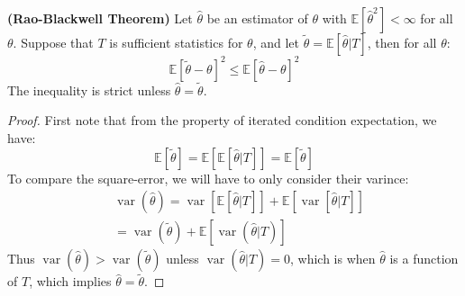 \begin{theorem}{\textbf{(Rao-Blackwell Theorem)}}
    Let $\hat{\theta}$ be an estimator of $\theta$ with $\mathbb{E}[\hat{\theta}^2]<\infty$ for all $\theta$. Suppose that $T$ is sufficient statistics for $\theta$, and let $\tilde{\theta} = \mathbb{E}[\hat{\theta} | T]$, then for all $\theta$:
    \begin{equation*}
        \mathbb{E}[\tilde{\theta} - \theta]^2 \le \mathbb{E}[\hat{\theta} - \theta]^2
    \end{equation*}
    The inequality is strict unless $\hat{\theta} = \tilde{\theta}$.
\end{theorem}
\begin{proof}
    First note that from the property of iterated condition expectation, we have:
    \begin{equation*}
        \mathbb{E}[\tilde{\theta}] = \mathbb{E}[\mathbb{E}[\hat{\theta} | T]] = \mathbb{E}[\tilde{\theta}]
    \end{equation*}
    To compare the square-error, we will have to only consider their varince:
    \begin{equation*}
    \begin{aligned}
        &\operatorname{var}(\hat{\theta}) = \operatorname{var}[\mathbb{E}[\hat{\theta} | T]] + \mathbb{E}[\operatorname{var}[\hat{\theta} | T]] \\
        &= \operatorname{var}(\tilde{\theta}) + \mathbb{E}[\operatorname{var}(\hat{\theta} | T)]
    \end{aligned}
    \end{equation*}
    Thus $\operatorname{var}(\hat{\theta}) > \operatorname{var}(\tilde{\theta})$ unless $\operatorname{var}(\hat{\theta} | T) = 0$, which is when $\hat{\theta}$ is a function of $T$, which implies $\hat{\theta} =\tilde{\theta}$.
\end{proof}

